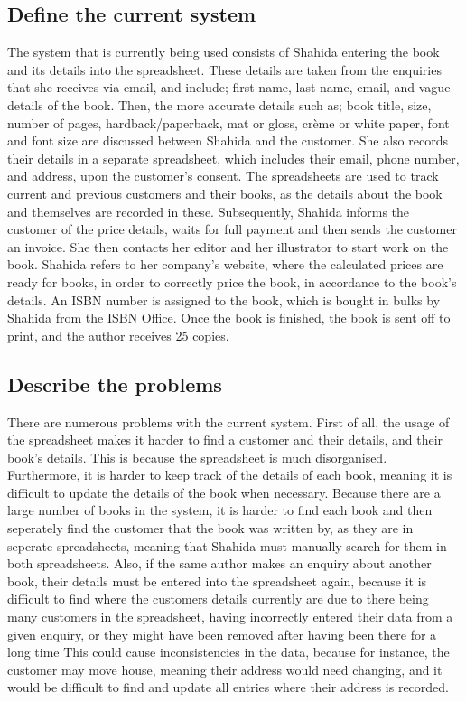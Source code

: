 \subsection{Define the current system}
The system that is currently being used consists of Shahida entering the book and its details into the spreadsheet. These details are taken from the enquiries that she receives via email, and include; first name, last name, email, and vague details of the book. Then, the more accurate details such as; book title, size, number of pages, hardback/paperback, mat or gloss, crème or white paper, font and font size are discussed between Shahida and the customer. She also records their details in a separate spreadsheet, which includes their email, phone number, and address, upon the customer's consent. The spreadsheets are used to track current and previous customers and their books, as the details about the book and themselves are recorded in these. Subsequently, Shahida informs the customer of the price details, waits for full payment and  then sends the customer an invoice. She then contacts her editor and her illustrator to start work on the book. Shahida refers to her company's website, where the calculated prices are ready for books, in order to correctly price the book, in accordance to the book’s details. An ISBN number is assigned to the book, which is bought in bulks by Shahida from the ISBN Office. Once the book is finished, the book is sent off to print, and the author receives 25 copies.

\subsection{Describe the problems}
There are numerous problems with the current system. First of all, the usage of the spreadsheet makes it harder to find a customer and their details, and their book’s details. This is because the spreadsheet is much disorganised. Furthermore, it is harder to keep track of the details of each book, meaning it is difficult to update the details of the book when necessary. Because there are a large number of books in the system, it is harder to find each book and then seperately find the customer that the book was written by, as they are in seperate spreadsheets, meaning that Shahida must manually search for them in both spreadsheets. Also, if the same author makes an enquiry about another book, their details must be entered into the spreadsheet again, because it is difficult to find where the customers details currently are due to there being many customers in the spreadsheet, having incorrectly entered their data from a given enquiry, or they might have been removed after having been there for a long time This could cause inconsistencies in the data, because for instance, the customer may move house, meaning their address would need changing, and it would be difficult to find and update all entries where their address is recorded. 
